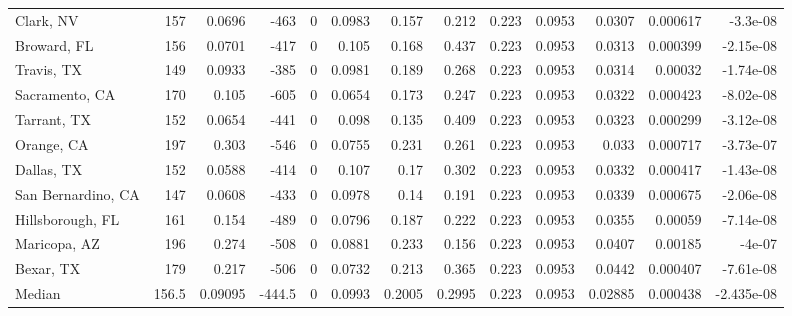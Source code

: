 \documentclass[12pt,letterpaper]{article}
\begin{document}
\begin{appendices}
\begin{sidewaystable}
{\begin{tabular}{lrrrrrrrrrrrr}
 Clark, NV          & 157   & 0.0696  & -463   &     0 &          0.0983 &           0.157  &         0.212  &              0.223 &             0.0953 &           0.0307  &        0.000617 &       -3.3e-08   \\
 Broward, FL        & 156   & 0.0701  & -417   &     0 &          0.105  &           0.168  &         0.437  &              0.223 &             0.0953 &           0.0313  &        0.000399 &       -2.15e-08  \\
 Travis, TX         & 149   & 0.0933  & -385   &     0 &          0.0981 &           0.189  &         0.268  &              0.223 &             0.0953 &           0.0314  &        0.00032  &       -1.74e-08  \\
 Sacramento, CA     & 170   & 0.105   & -605   &     0 &          0.0654 &           0.173  &         0.247  &              0.223 &             0.0953 &           0.0322  &        0.000423 &       -8.02e-08  \\
 Tarrant, TX        & 152   & 0.0654  & -441   &     0 &          0.098  &           0.135  &         0.409  &              0.223 &             0.0953 &           0.0323  &        0.000299 &       -3.12e-08  \\
 Orange, CA         & 197   & 0.303   & -546   &     0 &          0.0755 &           0.231  &         0.261  &              0.223 &             0.0953 &           0.033   &        0.000717 &       -3.73e-07  \\
 Dallas, TX         & 152   & 0.0588  & -414   &     0 &          0.107  &           0.17   &         0.302  &              0.223 &             0.0953 &           0.0332  &        0.000417 &       -1.43e-08  \\
 San Bernardino, CA & 147   & 0.0608  & -433   &     0 &          0.0978 &           0.14   &         0.191  &              0.223 &             0.0953 &           0.0339  &        0.000675 &       -2.06e-08  \\
 Hillsborough, FL   & 161   & 0.154   & -489   &     0 &          0.0796 &           0.187  &         0.222  &              0.223 &             0.0953 &           0.0355  &        0.00059  &       -7.14e-08  \\
 Maricopa, AZ       & 196   & 0.274   & -508   &     0 &          0.0881 &           0.233  &         0.156  &              0.223 &             0.0953 &           0.0407  &        0.00185  &       -4e-07     \\
 Bexar, TX          & 179   & 0.217   & -506   &     0 &          0.0732 &           0.213  &         0.365  &              0.223 &             0.0953 &           0.0442  &        0.000407 &       -7.61e-08  \\
\hline
 Median             & 156.5 & 0.09095 & -444.5 &     0 &          0.0993 &           0.2005 &         0.2995 &              0.223 &             0.0953 &           0.02885 &        0.000438 &       -2.435e-08 \\
\hline
\end{tabular}


}
\end{sidewaystable}
\end{appendices}
\end{document}
